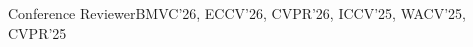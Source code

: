 
\begin{talks}
    \award
    {Conference Reviewer}{}{}{BMVC'26, ECCV'26, CVPR'26, ICCV'25, WACV'25, CVPR'25}
\end{talks}

\vspace{-4mm}